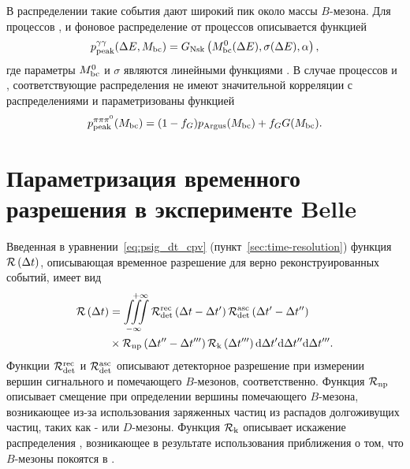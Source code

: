 В распределении \mbc такие события дают широкий пик около массы $B$-мезона.  Для процессов \bdstarpi, \bdstaretagg и \bdetap фоновое распределение \mbc от процессов \bpdstarrho описывается функцией
\begin{equation}\label{eq:mbc_peak_pdf_gg}
 p{}_{\mathrm{peak}}^{\gamma\gamma}(\Delta E,M_{\mathrm{bc}}) = G_{\mathrm{Nsk}}\left(M_{\mathrm{bc}}^0(\Delta E),\sigma(\Delta E),\alpha\right),
\end{equation}
где параметры $M_{\mathrm{bc}}^0$ и $\sigma$ являются линейными функциями \de.  В случае процессов \bdetappp и \bdomega, соответствующие \mbc распределения не имеют значительной корреляции с \de распределениями и параметризованы функцией
\begin{equation}\label{eq:mbc_peak_pdf_ppp}
 p{}_{\mathrm{peak}}^{\pi\pi\pi^0}(M_{\mathrm{bc}}) = (1-f_G)p_{\mathrm{Argus}}(M_{\mathrm{bc}})+f_G G(M_{\mathrm{bc}}).
\end{equation}





\chapter{Параметризация временного разрешения в эксперименте Belle} \label{app:time-resolution}
Введенная в уравнении~\eqref{eq:psig_dt_cpv} (пункт~\ref{sec:time-resolution}) функция $\mathcal{R}\left(\Delta t\right)$, описывающая временное разрешение для верно реконструированных событий, имеет вид
\begin{equation}
 \begin{split}
 \mathcal{R}\left(\Delta t\right) & = \iiint\limits_{-\infty}^{\phantom{--}+\infty}
     \mathcal{R}_{\det}^{\mathrm{rec}}\left(\Delta t    -\Delta t{}^{\prime}\right)
     \mathcal{R}_{\det}^{\mathrm{asc}}\left(\Delta t{}^{\prime}-\Delta t{}^{\prime\prime}\right) \\
     & \times \mathcal{R}_{\mathrm{np}}\left(\Delta t{}^{\prime\prime}-\Delta t{}^{\prime\prime\prime}\right)
              \mathcal{R}_{\mathrm{k}}\left(\Delta t{}^{\prime\prime\prime}\right)
     \mathrm{d}\Delta t{}^{\prime} \mathrm{d}\Delta t{}^{\prime\prime} \mathrm{d}\Delta t{}^{\prime\prime\prime}.
 \end{split}
\end{equation}
Функции $\mathcal{R}_{\det}^{\mathrm{rec}}$ и $\mathcal{R}_{\det}^{\mathrm{asc}}$ описывают детекторное разрешение при измерении вершин сигнального и помечающего $B$-мезонов, соответственно.  Функция $\mathcal{R}_{\mathrm{np}}$ описывает смещение при определении вершины помечающего $B$-мезона, возникающее из-за использования заряженных частиц из распадов долгоживущих частиц, таких как \ks- или $D$-мезоны.  Функция $\mathcal{R}_{\mathrm{k}}$ описывает искажение распределения \dt, возникающее в результате использования приближения о том, что $B$-мезоны покоятся в \cms.

